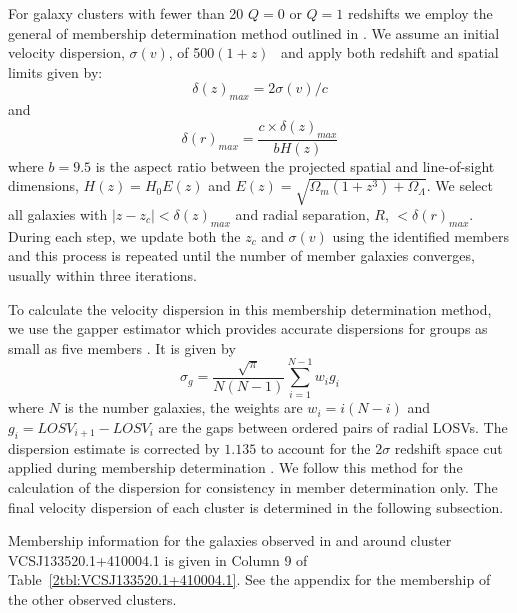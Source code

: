 For galaxy clusters with fewer than 20 $Q=0$ or $Q=1$ redshifts we employ the general of membership determination method outlined in \cite{Wilman2005, Connelly2012}. We assume an initial velocity dispersion, $\sigma(v)$, of 500$(1+z)$ \kms\ and apply both redshift and spatial limits given by: 
\begin{equation}
	\delta(z)_{max} = 2 \sigma(v)/c 
\end{equation}
and 
\begin{equation}
	\delta(r)_{max} = \frac{c\times\delta(z)_{max}}{bH(z)} 
\end{equation}
where $b=9.5$ is the aspect ratio between the projected spatial and line-of-sight dimensions, $H(z) = H_0 E(z)$ and $E(z) = \sqrt{\Omega_m(1+z^3)+\Omega_{\Lambda}}$. We select all galaxies with $|z-z_c| < \delta(z)_{max}$ and radial separation, $R$, $<\delta(r)_{max}$. During each step, we update both the $z_c$ and $\sigma(v)$ using the identified members and this process is repeated until the number of member galaxies converges, usually within three iterations.

To calculate the velocity dispersion in this membership determination method, we use the gapper estimator \citep{Beers1990} which provides accurate dispersions for groups as small as five members \citep{Hou2009}. It is given by 
\begin{equation}
	\sigma_g = \frac{\sqrt{\pi}}{N(N-1)} \sum_{i=1}^{N-1} w_i g_i
\end{equation}
where $N$ is the number galaxies, the weights are $w_i = i(N-i)$ and $g_i = LOSV_{i+1} - LOSV_i$ are the gaps between ordered pairs of radial LOSVs. The dispersion estimate is corrected by $1.135$ to account for the $2\sigma$ redshift space cut applied during membership determination \citep{Connelly2012}. We follow this method for the calculation of the dispersion for consistency in member determination only. The final velocity dispersion of each cluster is determined in the following subsection.

Membership information for the galaxies observed in and around cluster VCSJ133520.1+410004.1 is given in Column 9 of Table~\ref{2tbl:VCSJ133520.1+410004.1}. See the appendix for the membership of the other observed clusters.

